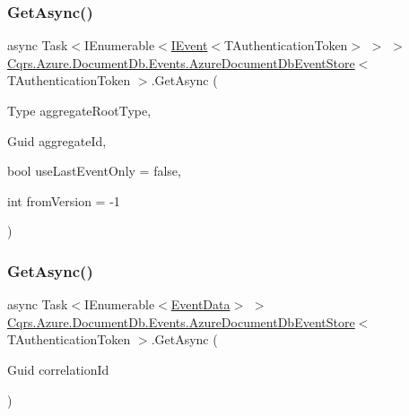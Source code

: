 \subsubsection{\texorpdfstring{Get\+Async()}{GetAsync()}\hspace{0.1cm}{\footnotesize\ttfamily [1/2]}}
{\footnotesize\ttfamily async Task$<$I\+Enumerable$<$\hyperlink{interfaceCqrs_1_1Events_1_1IEvent}{I\+Event}$<$T\+Authentication\+Token$>$ $>$ $>$ \hyperlink{classCqrs_1_1Azure_1_1DocumentDb_1_1Events_1_1AzureDocumentDbEventStore}{Cqrs.\+Azure.\+Document\+Db.\+Events.\+Azure\+Document\+Db\+Event\+Store}$<$ T\+Authentication\+Token $>$.Get\+Async (\begin{DoxyParamCaption}\item[{Type}]{aggregate\+Root\+Type,  }\item[{Guid}]{aggregate\+Id,  }\item[{bool}]{use\+Last\+Event\+Only = {\ttfamily false},  }\item[{int}]{from\+Version = {\ttfamily -\/1} }\end{DoxyParamCaption})\hspace{0.3cm}{\ttfamily [protected]}}

\mbox{\label{classCqrs_1_1Azure_1_1DocumentDb_1_1Events_1_1AzureDocumentDbEventStore_ae44ea4b68f4794022b685bc380abbd04_ae44ea4b68f4794022b685bc380abbd04}} 
\subsubsection{\texorpdfstring{Get\+Async()}{GetAsync()}\hspace{0.1cm}{\footnotesize\ttfamily [2/2]}}
{\footnotesize\ttfamily async Task$<$I\+Enumerable$<$\hyperlink{classCqrs_1_1Events_1_1EventData}{Event\+Data}$>$ $>$ \hyperlink{classCqrs_1_1Azure_1_1DocumentDb_1_1Events_1_1AzureDocumentDbEventStore}{Cqrs.\+Azure.\+Document\+Db.\+Events.\+Azure\+Document\+Db\+Event\+Store}$<$ T\+Authentication\+Token $>$.Get\+Async (\begin{DoxyParamCaption}\item[{Guid}]{correlation\+Id }\end{DoxyParamCaption})\hspace{0.3cm}{\ttfamily [protected]}}

